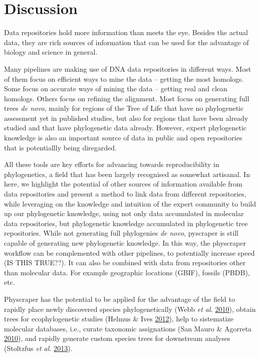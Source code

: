 \documentclass[]{article}
\begin{document}
\hypertarget{discussion}{%
\section{Discussion}\label{discussion}}

Data repositories hold more information than meets the eye.
Besides the actual data, they are rich sources of information that can be used for the advantage of biology and science in general.

Many pipelines are making use of DNA data repositories in different ways.
Most of them focus on efficient ways to mine the data -- getting the most homologs.
Some focus on accurate ways of mining the data -- getting real and clean homologs.
Others focus on refining the alignment.
Most focus on generating full trees \emph{de novo}, mainly for regions of the Tree of
Life that have no phylogenetic assessment yet in published studies, but also for
regions that have been already studied and that have phylogenetic data already.
However, expert phylogenetic knowledge is also an important source of data in public
and open repositories that is potentiallly being diregarded.

All these tools are key efforts for advancing towards reproducibility in phylogenetics,
a field that has been largely recognised as somewhat artisanal.
In here, we highlight the potential of other sources of information available from data repositories and present a method to link data from different repositories, while leveraging on the knowledge and intuition of the expert
community to build up our phylogenetic knowledge, using not only data accumulated in
molecular data repositories, but phylogenetic knowledge accumulated in phylogenetic tree repositories.
While not generating full phylogenies \emph{de novo}, pyscraper is still capable of generating new phylogenetic knowledge.
In this way, the physcraper workflow can be complemented with other pipelines, to potentially increase speed (IS THIS TRUE??).
It can also be combined with data from repositories other than molecular data. For example geographic locations (GBIF), fossils (PBDB), etc.

Physcraper has the potential to be applied for the advantage of the field to rapidly
place newly discovered species phylogenetically (Webb \emph{et al.} \protect\hyperlink{ref-webb2010biodiversity}{2010}),
obtain trees for ecophylogenetic studies (Helmus \& Ives \protect\hyperlink{ref-helmus2012phylogenetic}{2012}),
help to sistematize molecular databases, i.e., curate taxonomic assignations (San Mauro \& Agorreta \protect\hyperlink{ref-san2010molecular}{2010}),
and rapidly generate custom species trees for downstream analyses (Stoltzfus \emph{et al.} \protect\hyperlink{ref-stoltzfus2013phylotastic}{2013}).
\end{document}
